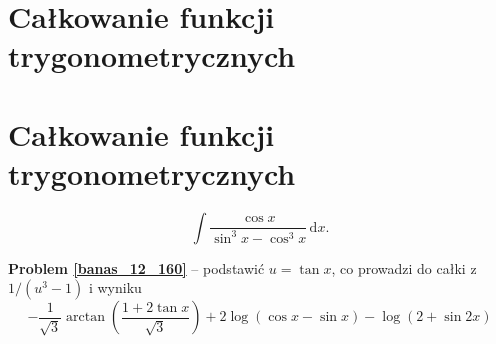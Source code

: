 %

\section{Całkowanie funkcji trygonometrycznych}
\section{Całkowanie funkcji trygonometrycznych}

\begin{problem_with_solution}
    \label{banas_12_160}%
\begin{equation}
    \int \frac{\cos x}{\sin^3 x - \cos^3 x} \, \mathrm{d} x.
\end{equation}
\end{problem_with_solution}

\textbf{Problem \ref{banas_12_160}} -- podstawić $u = \tan x$, co prowadzi do całki z $1/(u^3-1)$ i wyniku
\begin{equation}
    -\frac {1}{\sqrt{3}} \arctan \left( \frac{1 + 2 \tan x}{\sqrt{3}} \right) 
    + 2 \log (\cos x - \sin x) 
    - \log (2 + \sin 2x)
\end{equation}

%